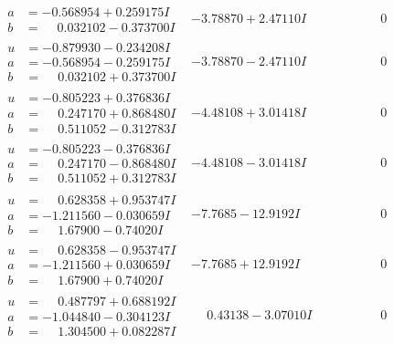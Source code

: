 \documentclass[1p]{elsarticle_modified}
\theoremstyle{definition}
\begin{document}
$$\begin{array}{c|c|c}
\begin{aligned}
a &= -0.568954 + 0.259175 I \\
b &= \phantom{-}0.032102 - 0.373700 I\end{aligned}
 & -3.78870 + 2.47110 I & \phantom{-0.000000 } 0 \\ \hline\begin{aligned}
u &= -0.879930 - 0.234208 I \\
a &= -0.568954 - 0.259175 I \\
b &= \phantom{-}0.032102 + 0.373700 I\end{aligned}
 & -3.78870 - 2.47110 I & \phantom{-0.000000 } 0 \\ \hline\begin{aligned}
u &= -0.805223 + 0.376836 I \\
a &= \phantom{-}0.247170 + 0.868480 I \\
b &= \phantom{-}0.511052 - 0.312783 I\end{aligned}
 & -4.48108 + 3.01418 I & \phantom{-0.000000 } 0 \\ \hline\begin{aligned}
u &= -0.805223 - 0.376836 I \\
a &= \phantom{-}0.247170 - 0.868480 I \\
b &= \phantom{-}0.511052 + 0.312783 I\end{aligned}
 & -4.48108 - 3.01418 I & \phantom{-0.000000 } 0 \\ \hline\begin{aligned}
u &= \phantom{-}0.628358 + 0.953747 I \\
a &= -1.211560 - 0.030659 I \\
b &= \phantom{-}1.67900 - 0.74020 I\end{aligned}
 & -7.7685 - 12.9192 I & \phantom{-0.000000 } 0 \\ \hline\begin{aligned}
u &= \phantom{-}0.628358 - 0.953747 I \\
a &= -1.211560 + 0.030659 I \\
b &= \phantom{-}1.67900 + 0.74020 I\end{aligned}
 & -7.7685 + 12.9192 I & \phantom{-0.000000 } 0 \\ \hline\begin{aligned}
u &= \phantom{-}0.487797 + 0.688192 I \\
a &= -1.044840 - 0.304123 I \\
b &= \phantom{-}1.304500 + 0.082287 I\end{aligned}
 & \phantom{-}0.43138 - 3.07010 I & \phantom{-0.000000 } 0 \\ \hline\begin{aligned}

\end{aligned}
\end{array}$$
\end{document}
